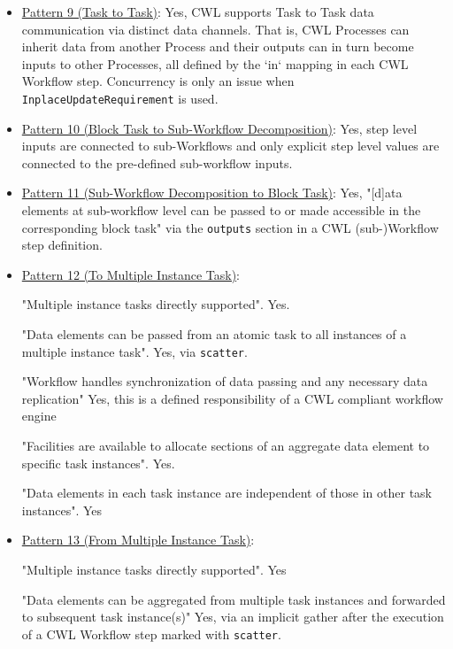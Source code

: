 \begin{itemize}
\item \href{http://www.workflowpatterns.com/patterns/data/internal/wdp9.php}{Pattern 9 (Task to Task)}: Yes, CWL supports Task to Task data communication via distinct data channels. That is, CWL Processes can inherit data from another Process and their outputs can in turn become inputs to other Processes, all defined by the `in` mapping in each CWL Workflow step. Concurrency is only an issue when \verb|InplaceUpdateRequirement| is used.

\item \href{http://www.workflowpatterns.com/patterns/data/internal/wdp10.php}{Pattern 10 (Block Task to Sub-Workflow Decomposition)}: Yes, step level inputs are connected to sub-Workflows and only explicit step level values are connected to the pre-defined sub-workflow inputs.

\item \href{http://www.workflowpatterns.com/patterns/data/internal/wdp11.php}{Pattern 11 (Sub-Workflow Decomposition to Block Task)}: Yes, "[d]ata elements at sub-workflow level can be passed to or made accessible in the corresponding block task" via the \verb|outputs| section in a CWL (sub-)Workflow step definition.

\item \href{http://www.workflowpatterns.com/patterns/data/internal/wdp12.php}{Pattern 12 (To Multiple Instance Task)}:

"Multiple instance tasks directly supported". Yes.

"Data elements can be passed from an atomic task to all instances of a multiple instance task". Yes, via \verb|scatter|.

"Workflow handles synchronization of data passing and any necessary data replication" Yes, this is a defined responsibility of a CWL compliant workflow engine

"Facilities are available to allocate sections of an aggregate data element to specific task instances". Yes.

"Data elements in each task instance are independent of those in other task instances". Yes

\item \href{http://www.workflowpatterns.com/patterns/data/internal/wdp13.php}{Pattern 13 (From Multiple Instance Task)}:

"Multiple instance tasks directly supported". Yes

"Data elements can be aggregated from multiple task instances and forwarded to subsequent task instance(s)" Yes, via an implicit gather after the execution of a CWL Workflow step marked with \verb|scatter|.


\end{itemize}
